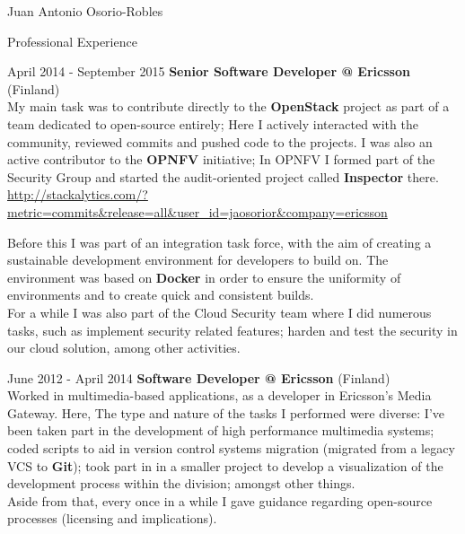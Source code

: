 \documentclass[english,10pt,letterpaper]{article}
\begin{document}
\begin{cv}{Juan Antonio Osorio-Robles}
\begin{cvlist}{Professional Experience}
		\item [April 2014 - September 2015]
            \textbf{Senior Software Developer @ Ericsson} (Finland)\\
            My main task was to contribute directly to the
            \textbf{OpenStack} project as part of a team dedicated to
            open-source entirely; Here I actively interacted with the
            community, reviewed commits and pushed code to the projects.
            I was also an active contributor to the \textbf{OPNFV}
            initiative; In OPNFV I formed part of the Security Group and
            started the audit-oriented project called \textbf{Inspector}
            there.\\

            \href{http://stackalytics.com/?metric=commits&release=all&user_id=jaosorior&company=ericsson}
            {\url{http://stackalytics.com/?metric=commits&release=all&user_id=jaosorior&company=ericsson}}

            Before this I was part of an integration task force, with the
            aim of creating a sustainable development environment for
            developers to build on. The environment was based on
            \textbf{Docker} in order to ensure the uniformity of
            environments and to create quick and consistent builds.\\

            For a while I was also part of the Cloud Security team where
            I did numerous tasks, such as implement security related
            features; harden and test the security in our cloud solution,
            among other activities.

		\item [June 2012 - April 2014]
            \textbf{Software Developer @ Ericsson} (Finland)\\
            Worked in multimedia-based applications, as a developer in
            Ericsson's Media Gateway. Here, The type and nature of the
            tasks I performed were diverse: I've been taken part in the
            development of high performance multimedia systems; coded
            scripts to aid in version control systems migration (migrated
            from a legacy VCS to \textbf{Git}); took part in in a smaller
            project to develop a visualization of the development process
            within the division; amongst other things.\\

            Aside from that, every once in a while I gave guidance
            regarding open-source processes (licensing and implications).


\end{cvlist}
\end{cv}
\end{document}
